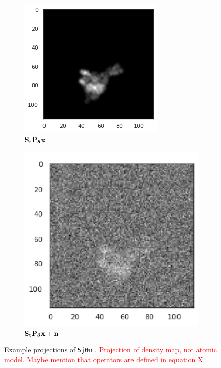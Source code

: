 \begin{figure}[ht!]
\begin{minipage}[b]{0.35\linewidth}
\begin{subfigure}[b]{0.49\linewidth}
            \centering
            \includegraphics[width=0.8\linewidth]{figures/5j0n_translated}
            \caption*{$\mathbf{S}_{\mathbf{t}} \mathbf{P}_{{\boldsymbol{\theta}}} \mathbf{x}$}
        \end{subfigure}
        \hfill
        \begin{subfigure}[b]{0.49\linewidth}
            \centering
            \includegraphics[width=0.8\linewidth]{figures/5j0n_noise16_translated}
            \caption*{$\mathbf{S}_{\mathbf{t}} \mathbf{P}_{{\boldsymbol{\theta}}} \mathbf{x} + \mathbf{n}$}
        \end{subfigure}
        \caption{%
            Example projections of \texttt{5j0n} \textcolor{red}{. Projection of density map, not atomic model. Maybe mention that operators are defined in equation X}.
        }\label{fig:different-projections}
    \end{minipage}
\end{figure}

